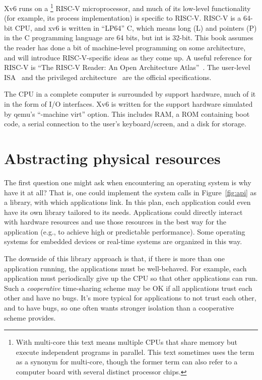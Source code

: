 Xv6 runs on a \footnote{
With multi-core this text means multiple CPUs that share memory but execute independent
programs in parallel.
This text sometimes uses the term
 as a synonym for multi-core,
though the former term can also refer to a computer board with
several distinct processor chips.} RISC-V microprocessor,
and much of its low-level
functionality (for example, its process implementation) is specific to
RISC-V.  RISC-V is a 64-bit CPU, and xv6 is written in ``LP64'' C,
which means long (L) and pointers (P) in the C programming language
are 64 bits, but int is 32-bit.  This book assumes the reader has done
a bit of machine-level programming on some architecture, and will
introduce RISC-V-specific ideas as they come up.  A useful reference
for RISC-V is ``The RISC-V Reader: An Open Architecture
Atlas''~\cite{riscv}.
The user-level ISA~\cite{riscv:user} and the privileged
architecture~\cite{riscv:priv} are the official specifications.

The CPU in a complete computer is surrounded by support hardware, much
of it in the form of I/O interfaces. Xv6 is written for the support
hardware simulated by qemu's ``-machine virt'' option. This includes
RAM, a ROM containing boot code, a serial connection to the user's
keyboard/screen, and a disk for storage.

\section{Abstracting physical resources}

The first question one might ask when encountering an operating system is why
have it at all?  That is, one could implement the system calls in
Figure~\ref{fig:api}
as a library, with which applications link.  In this plan,
each application could even have its own library tailored to its needs.
Applications could directly interact with hardware resources
and use those resources in the best way for the application (e.g., to achieve
high or predictable performance).  Some operating systems for
embedded devices or real-time systems are organized in this way.

The downside of this library approach is that, if there is more than one
application running, the applications must be well-behaved.
For example, each application must periodically give up the
CPU so that other applications can run.
Such a 
\textit{cooperative} 
time-sharing scheme may be OK if all applications trust each
other and have no bugs. It's more typical for applications
to not trust each other, and to have bugs, so one often wants
stronger isolation than a cooperative scheme provides.

